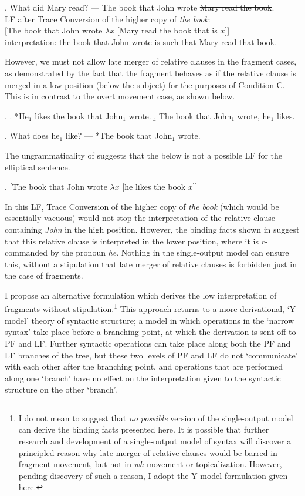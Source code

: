 \documentclass[11pt,letterpaper]{article}
\newcommand{\el}[1]{\sout{#1}}
\begin{document}
\ex.	What did Mary read? --- The book that John wrote \el{Mary read the book}.\\
	LF after Trace Conversion of the higher copy of {\it the book}:\\
		{}[The book that John wrote $\lambda x$ [Mary read the book that is $x$]]{}\\
	interpretation: the book that John wrote is such that Mary read that book.
	
However, we must not allow late merger of relative clauses in the fragment cases, as demonstrated by the fact that the fragment behaves as if the relative clause is merged in a low position (below the subject) for the purposes of Condition C.
This is in contrast to the overt movement case, as shown below.

\ex. 	\a. *He$_1$ likes the book that John$_1$ wrote.
	\b. The book that John$_1$ wrote, he$_1$ likes.
	
\ex. 	What does he$_1$ like? --- *The book that John$_1$ wrote.

The ungrammaticality of \Last suggests that the below is not a possible LF for the elliptical sentence.

\ex. 	[The book that John wrote $\lambda x$ [he likes the book $x$]]

In this LF, Trace Conversion of the higher copy of {\it the book} (which would be essentially vacuous) would not stop the interpretation of the relative clause containing {\it John} in the high position.
However, the binding facts shown in \LLast suggest that this relative clause is interpreted in the lower position, where it is c-commanded by the pronoun {\it he}.
Nothing in the single-output model can ensure this, without a stipulation that late merger of relative clauses is forbidden just in the case of fragments.

I propose an alternative formulation which derives the low interpretation of fragments without stipulation.\footnote{I do not mean to suggest that \emph{no possible} version of the single-output model can derive the binding facts presented here.
It is possible that further research and development of a single-output model of syntax will discover a principled reason why late merger of relative clauses would be barred in fragment movement, but not in {\it wh-}movement or topicalization.
However, pending discovery of such a reason, I adopt the Y-model formulation given here.}
This approach returns to a more derivational, `Y-model' theory of syntactic structure; a model in which operations in the `narrow syntax' take place before a branching point, at which the derivation is sent off to PF and LF.
Further syntactic operations can take place along both the PF and LF branches of the tree, but these two levels of PF and LF do not `communicate' with each other after the branching point, and operations that are performed along one `branch' have no effect on the interpretation given to the syntactic structure on the other `branch'.
\end{document}
